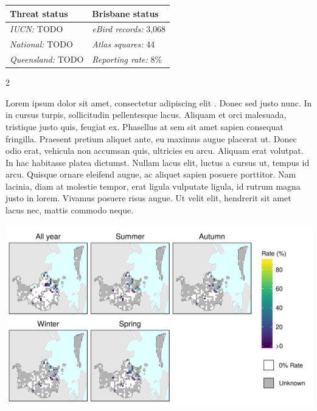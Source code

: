 \documentclass[12pt,openany,oneside]{book}
\let\origfigure\figure
\let\endorigfigure\endfigure
\renewenvironment{figure}[1][2] {
  \expandafter\origfigure\expandafter[H]
} {
  \endorigfigure
}
\let\Begin\begin
\let\End\end
\theoremstyle{definition}
\theoremstyle{definition}
\theoremstyle{definition}
\theoremstyle{remark}
\begin{document}
\begin{tabu} to 
\toprule
Threat status & Brisbane status\\
\midrule
\textit{IUCN:} TODO & \textit{eBird records:} 3,068\\
\textit{National:} TODO & \textit{Atlas squares:} 44\\
\textit{Queensland:} TODO & \textit{Reporting rate:} 8\%\\
\bottomrule
\end{tabu} 
\vspace{0.15cm}

\Begin{multicols}{2}

Lorem ipsum dolor sit amet, consectetur adipiscing elit
\citep{rexample1, rexample2, rexample3}. Donec sed justo nunc. In in
cursus turpis, sollicitudin pellentesque lacus. Aliquam et orci
malesuada, tristique justo quis, feugiat ex. Phasellus at sem sit amet
sapien consequat fringilla. Praesent pretium aliquet ante, eu maximus
augue placerat ut. Donec odio erat, vehicula non accumsan quis,
ultricies eu arcu. Aliquam erat volutpat. In hac habitasse platea
dictumst. Nullam lacus elit, luctus a cursus ut, tempus id arcu. Quisque
ornare eleifend augue, ac aliquet sapien posuere porttitor. Nam lacinia,
diam at molestie tempor, erat ligula vulputate ligula, id rutrum magna
justo in lorem. Vivamus posuere risus augue. Ut velit elit, hendrerit
sit amet lacus nec, mattis commodo neque.

\End{multicols}

\clearpage

\begin{figure}
\centering
\includegraphics[height=0.47\textheight,width=\textwidth,keepaspectratio=true]{assets/maps/Anas-castanea.png}
\end{figure}
\end{document}
